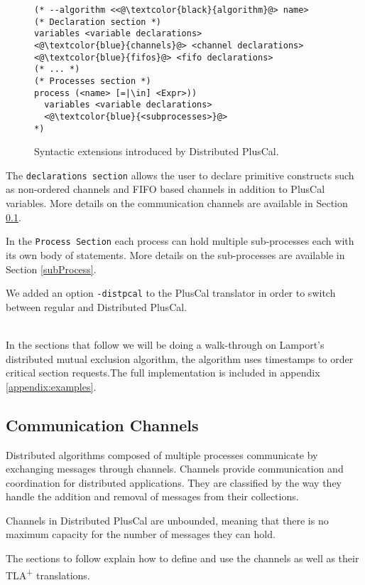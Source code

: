\documentclass{article}
\newcommand{\tlaplus}{TLA\textsuperscript{+}\xspace}
\begin{document}
\begin{figure}
\begin{lstlisting}[language=pluscal, frame = tlrb, numbers = none]
(* --algorithm <<@\textcolor{black}{algorithm}@> name>
(* Declaration section *)
variables <variable declarations>
<@\textcolor{blue}{channels}@> <channel declarations>
<@\textcolor{blue}{fifos}@> <fifo declarations>
(* ... *)
(* Processes section *)
process (<name> [=|\in] <Expr>))
  variables <variable declarations>
  <@\textcolor{blue}{<subprocesses>}@>
*)
\end{lstlisting}

\caption{Syntactic extensions introduced by Distributed PlusCal.}
\label{dpluscal-struct}
\end{figure}

The \verb|declarations section| allows the user to declare primitive constructs such as non-ordered channels and FIFO based channels in addition to PlusCal variables. More details on the communication channels are available in Section \ref{comChannels}.

In the \verb|Process Section| each process can hold multiple sub-processes each with its own body of statements. More details on the sub-processes are available in Section \ref{subProcess}.

We added an option \verb|-distpcal| to the PlusCal translator in order to switch between regular and Distributed PlusCal.

\hfill\\
In the sections that follow we will be doing a walk-through on Lamport's distributed mutual exclusion algorithm, the algorithm uses timestamps to order critical section requests.The full implementation is included in appendix \ref{appendix:examples}.

\subsection{Communication Channels}
\label{comChannels}
Distributed algorithms composed of multiple processes communicate by exchanging messages through channels. Channels provide communication and coordination for distributed applications. They are classified by the way they handle the addition and removal of messages from their collections.

Channels in Distributed PlusCal are unbounded, meaning that there is no maximum capacity for the number of messages they can hold.

The sections to follow explain how to define and use the channels as well as their \tlaplus translations. 
\end{document}
